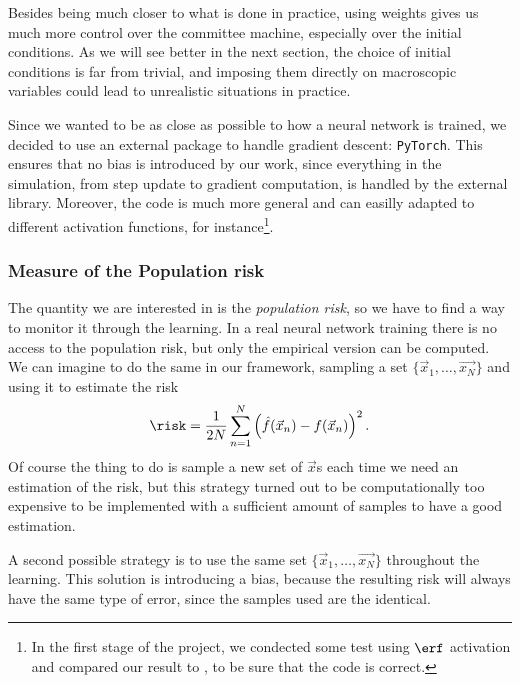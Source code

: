 Besides being much closer to what is done in practice, using weights gives us much more control over
the committee machine, especially over the initial conditions. 
As we will see better in the next section, the choice of initial conditions is far from trivial,
and imposing them directly on macroscopic variables could lead to unrealistic situations in practice.

Since we wanted to be as close as possible to how a neural network is trained,
we decided to use an external package to handle gradient descent: \texttt{PyTorch}\cite{pytorch2019}.
This ensures that no bias is introduced by our work, since everything in the simulation,
from step update to gradient computation, is handled by the external library.
Moreover, the code is much more general and can easilly adapted to different activation
functions, for instance\footnote{
    In the first stage of the project, we condected some test using \(\erf\) activation and compared
    our result to \cite{veiga2022phase}, to be sure that the code is correct.
}.

\subsubsection{Measure of the Population risk}
The quantity we are interested in is the \emph{population risk}, so we have to find
a way to monitor it through the learning. In a real neural network training there is 
no access to the population risk, but only the empirical version can be computed.
We can imagine to do the same in our framework, sampling a set \(\{\vec{x}_1,\dots,\vec{x_N}\}\) 
and using it to estimate the risk
\[\risk = \frac{1}{2N}\sum_{n=1}^N\left(\hat{f}(\vec{x}_n)-f(\vec{x}_n)\right)^2.\]
Of course the thing to do is sample a new set of \(\vec{x}\)s each time we need an estimation
of the risk, but this strategy turned out to be computationally too expensive to be
implemented with a sufficient amount of samples to have a good estimation.

A second possible strategy is to use the same set \(\{\vec{x}_1,\dots,\vec{x_N}\}\) 
throughout the learning. This solution is introducing a bias, because the resulting risk
will always have the same type of error, since the samples used are the identical.

